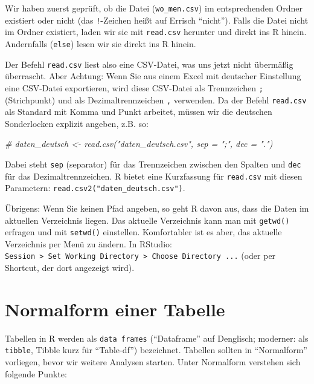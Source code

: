\documentclass[12pt,]{book}
\makeatletter
\newenvironment{Shaded}{\begin{snugshade}}{\end{snugshade}}
\newcommand{\CommentTok}[1]{\textcolor[rgb]{0.56,0.35,0.01}{\textit{{#1}}}}
\newenvironment{kframe}{%
\medskip{}
\setlength{\fboxsep}{.8em}
 \def\at@end@of@kframe{}%
 \ifinner\ifhmode%
  \def\at@end@of@kframe{\end{minipage}}%
  \begin{minipage}{\columnwidth}%
 \fi\fi%
 \def\FrameCommand##1{\hskip\@totalleftmargin \hskip-\fboxsep
 \colorbox{shadecolor}{##1}\hskip-\fboxsep
     \hskip-\linewidth \hskip-\@totalleftmargin \hskip\columnwidth}%
 \MakeFramed {\advance\hsize-\width
   \@totalleftmargin\z@ \linewidth\hsize
   \@setminipage}}%
 {\par\unskip\endMakeFramed%
 \at@end@of@kframe}
\renewenvironment{Shaded}{\begin{kframe}}{\end{kframe}}
\makeatother
\begin{document}
Wir haben zuerst geprüft, ob die Datei (\texttt{wo\_men.csv}) im
entsprechenden Ordner existiert oder nicht (das \texttt{!}-Zeichen heißt
auf Errisch ``nicht''). Falls die Datei nicht im Ordner existiert, laden
wir sie mit \texttt{read.csv} herunter und direkt ins R hinein.
Andernfalls (\texttt{else}) lesen wir sie direkt ins R hinein.

Der Befehl \texttt{read.csv} liest also eine CSV-Datei, was uns jetzt
nicht übermäßig überrascht. Aber Achtung: Wenn Sie aus einem Excel mit
deutscher Einstellung eine CSV-Datei exportieren, wird diese CSV-Datei
als Trennzeichen \texttt{;} (Strichpunkt) und als Dezimaltrennzeichen
\texttt{,} verwenden. Da der Befehl \texttt{read.csv} als Standard mit
Komma und Punkt arbeitet, müssen wir die deutschen Sonderlocken explizit
angeben, z.B. so:

\begin{Shaded}
\begin{Highlighting}[]
\CommentTok{# daten_deutsch <- read.csv("daten_deutsch.csv", sep = ";", dec = ".")}
\end{Highlighting}
\end{Shaded}

Dabei steht \texttt{sep} (separator) für das Trennzeichen zwischen den
Spalten und \texttt{dec} für das Dezimaltrennzeichen. R bietet eine
Kurzfassung für \texttt{read.csv} mit diesen Parametern:
\texttt{read.csv2("daten\_deutsch.csv")}.

Übrigens: Wenn Sie keinen Pfad angeben, so geht R davon aus, dass die
Daten im aktuellen Verzeichnis liegen. Das aktuelle Verzeichnis kann man
mit \texttt{getwd()} erfragen und mit \texttt{setwd()} einstellen.
Komfortabler ist es aber, das aktuelle Verzeichnis per Menü zu ändern.
In RStudio:
\texttt{Session\ \textgreater{}\ Set\ Working\ Directory\ \textgreater{}\ Choose\ Directory\ ...}
(oder per Shortcut, der dort angezeigt wird).

\section{Normalform einer Tabelle}\label{normalform-einer-tabelle}

Tabellen in R werden als \texttt{data\ frames} (``Dataframe'' auf
Denglisch; moderner: als \texttt{tibble}, Tibble kurz für ``Table-df'')
bezeichnet. Tabellen sollten in ``Normalform'' vorliegen, bevor wir
weitere Analysen starten. Unter Normalform verstehen sich folgende
Punkte:
\end{document}

